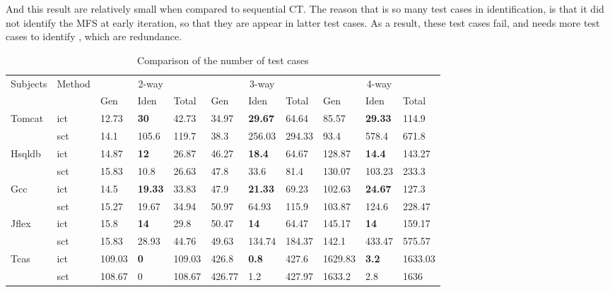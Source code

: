 \documentclass{sig-alternate}
\begin{document}
And this result are relatively small when compared to sequential CT.  The reason that is so many test cases in identification, is that it did not identify the MFS at early iteration, so that they are appear in latter test cases. As a result, these test cases fail, and needs more test cases to identify , which are redundance.

\begin{table}[htbp]
\center
\caption{Comparison of the number of test cases}
\label{cm_elda_fglt_test}
\begin{tabular}{|ll|lll|lll|lll|}
\hline
\multirow{2}{*}{Subjects} & \multirow{2}{*}{Method} & \multicolumn{3}{c|}{2-way} & \multicolumn{3}{c|}{3-way} & \multicolumn{3}{c|}{4-way} \\ \cline{3-11}
                          &                         &Gen  & Iden & Total  &  Gen  & Iden & Total  & Gen  & Iden & Total   \\ \hline
Tomcat                    & ict                     & 12.73    & \textbf{30}     & 42.73  & 34.97    & \textbf{29.67}  & 64.64  & 85.57   & \textbf{29.33}  & 114.9   \\
                          & sct                     & 14.1     & 105.6  & 119.7  & 38.3     & 256.03 & 294.33 & 93.4    & 578.4  & 671.8   \\ \hline
Hsqldb                    & ict                     & 14.87    & \textbf{12}     & 26.87  & 46.27    & \textbf{18.4}   & 64.67  & 128.87  & \textbf{14.4}   & 143.27  \\
                          & sct                     & 15.83    & 10.8   & 26.63  & 47.8     & 33.6   & 81.4   & 130.07  & 103.23 & 233.3   \\ \hline
Gcc                       & ict                     & 14.5     & \textbf{19.33}  & 33.83  & 47.9     & \textbf{21.33}  & 69.23  & 102.63  & \textbf{24.67}  & 127.3   \\
                          & sct                     & 15.27    & 19.67  & 34.94  & 50.97    & 64.93  & 115.9  & 103.87  & 124.6  & 228.47  \\ \hline
Jflex                     & ict                     & 15.8     & \textbf{14}     & 29.8   & 50.47    & \textbf{14}     & 64.47  & 145.17  & \textbf{14}     & 159.17  \\
                          & sct                     & 15.83    & 28.93  & 44.76  & 49.63    & 134.74 & 184.37 & 142.1   & 433.47 & 575.57  \\ \hline
Tcas                      & ict                     & 109.03   & \textbf{0}      & 109.03 & 426.8    & \textbf{0.8}    & 427.6  & 1629.83 & \textbf{3.2}    & 1633.03 \\
                          & sct                     & 108.67   & 0      & 108.67 & 426.77   & 1.2    & 427.97 & 1633.2  & 2.8    & 1636    \\ \hline
\end{tabular}
\end{table}
\end{document}
